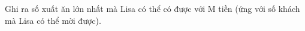 Ghi ra số xuất ăn lớn nhất mà Lisa có thể có được với M tiền (ứng với số khách mà Lisa có thể mời được).